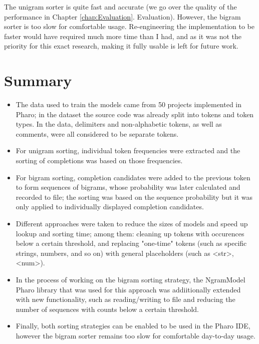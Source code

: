 The unigram sorter is quite fast and accurate (we go over the quality of the performance in Chapter \ref{chap:Evaluation}. Evaluation). However, the bigram sorter is too slow for comfortable usage. Re-engineering the implementation to be faster would have required much more time than I had, and as it was not the priority for this exact research, making it fully usable is left for future work.

\section{Summary}
\label{sec:ProposedSolution-Summary}
\begin{itemize}
    \item The data used to train the models came from 50 projects implemented in Pharo; in the dataset the source code was already split into tokens and token types. In the data, delimiters and non-alphabetic tokens, as well as comments, were all considered to be separate tokens.
    \item For unigram sorting, individual token frequencies were extracted and the sorting of completions was based on those frequencies.
    \item For bigram sorting, completion candidates were added to the previous token to form sequences of bigrams, whose probability was later calculated and recorded to file; the sorting was based on the sequence probability but it was only applied to individually displayed completion candidates.
    \item Different approaches were taken to reduce the sizes of models and speed up lookup and sorting time; among them: cleaning up tokens with occurences below a certain threshold, and replacing "one-time" tokens (such as specific strings, numbers, and so on) with general placeholders (such as <str>, <num>).
    \item In the process of working on the bigram sorting strategy, the NgramModel Pharo library that was used for this approach was addiitionally extended with new functionality, such as reading/writing to file and reducing the number of sequences with counts below a certain threshold.
    \item Finally, both sorting strategies can be enabled to be used in the Pharo IDE, however the bigram sorter remains too slow for comfortable day-to-day usage.
\end{itemize}